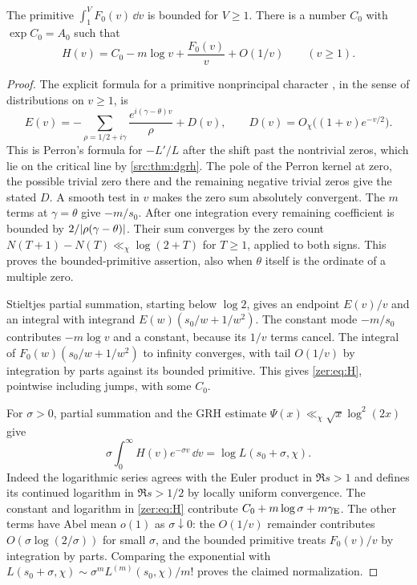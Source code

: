 \begin{lemma}\label{zer:lem:primitive}
The primitive $\int_1^VF_0(v)\,\dd v$ is bounded for $V\ge1$. There is a number $C_0$ with
$\exp C_0=A_0$ such that
\begin{equation}\label{zer:eq:H}
 H(v)=C_0-m\log v+\frac{F_0(v)}v+O(1/v)\qquad(v\ge1).
\end{equation}
\end{lemma}
\begin{proof}
The explicit formula for a primitive nonprincipal character
\cite{Davenport2000Multiplicative,Koukoulopoulos2019Distribution}, in the sense of
distributions on $v\ge1$, is
\begin{equation}\label{zer:eq:explicit}
 E(v)=-\sum_{\rho=1/2+i\gamma}\frac{e^{i(\gamma-\theta)v}}{\rho}+D(v),
 \qquad D(v)=O_\chi\bigl((1+v)e^{-v/2}\bigr).
\end{equation}
This is Perron's formula for $-L'/L$ after the shift past the nontrivial zeros, which lie on
the critical line by \cref{src:thm:dgrh}. The pole of the Perron kernel at zero, the possible
trivial zero there and the remaining negative trivial zeros give the stated $D$. A smooth test
in $v$ makes the zero sum absolutely convergent. The $m$ terms at $\gamma=\theta$ give
$-m/s_0$. After one integration every remaining coefficient is bounded by
$2/\lvert\rho(\gamma-\theta)\rvert$. Their sum converges by the zero count
$N(T+1)-N(T)\ll_\chi\log(2+T)$ for $T\ge1$, applied to both signs. This proves the
bounded-primitive assertion, also when $\theta$ itself is the ordinate of a multiple zero.

Stieltjes partial summation, starting below $\log2$, gives an endpoint $E(v)/v$ and an
integral with integrand $E(w)(s_0/w+1/w^2)$. The constant mode $-m/s_0$ contributes
$-m\log v$ and a constant, because its $1/v$ terms cancel. The integral of
$F_0(w)(s_0/w+1/w^2)$ to infinity converges, with tail $O(1/v)$ by integration by parts
against its bounded primitive. This gives \eqref{zer:eq:H}, pointwise including jumps, with
some $C_0$.

For $\sigma>0$, partial summation and the GRH estimate $\Psi(x)\ll_\chi\sqrt x\log^2(2x)$ give
\[
 \sigma\int_0^\infty H(v)e^{-\sigma v}\,\dd v=\log L(s_0+\sigma,\chi).
\]
Indeed the logarithmic series agrees with the Euler product in $\Re s>1$ and defines its
continued logarithm in $\Re s>1/2$ by locally uniform convergence. The constant and logarithm
in \eqref{zer:eq:H} contribute $C_0+m\log\sigma+m\gamma_{\mathrm{E}}$. The other terms have Abel mean
$o(1)$ as $\sigma\downarrow0$: the $O(1/v)$ remainder contributes $O(\sigma\log(2/\sigma))$
for small $\sigma$, and the bounded primitive treats $F_0(v)/v$ by integration by parts.
Comparing the exponential with $L(s_0+\sigma,\chi)\sim\sigma^mL^{(m)}(s_0,\chi)/m!$ proves
the claimed normalization.
\end{proof}

